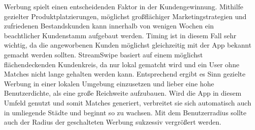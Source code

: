 Werbung spielt einen entscheidenden Faktor in der Kundengewinnung. Mithilfe gezielter Produktplatzierungen, möglichst großflächiger Marketingstrategien und zufriedenen Bestandskunden kann innerhalb von wenigen Wochen ein beachtlicher Kundenstamm aufgebaut werden. Timing ist in diesem Fall sehr wichtig, da die angeworbenen Kunden möglichst gleichzeitig mit der App bekannt gemacht werden sollten. StreamSwipe basiert auf einem möglichst flächendeckenden Kundenkreis, da nur lokal gematcht wird und ein User ohne Matches nicht lange gehalten werden kann. Entsprechend ergibt es Sinn gezielte Werbung in einer lokalen Umgebung einzusetzen  und lieber eine hohe Benutzerdichte, als eine große Reichweite aufzubauen. Wird die App in diesem Umfeld genutzt und somit Matches generiert, verbreitet sie sich automatisch auch in umliegende Städte und beginnt so zu wachsen. Mit dem Benutzerradius sollte auch der Radius der geschalteten Werbung sukzessiv vergrößert werden.